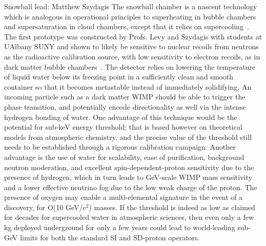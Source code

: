 Snowball lead: Matthew Szydagis
The snowball chamber is a nascent technology which is analogous in operational principles to superheating in bubble chambers and supersaturation in cloud chambers, except that it relies on supercooling~\cite{szydagis2021}. The first prototype was constructed by Profs. Levy and Szydagis with students at UAlbany SUNY and shown to likely be sensitive to nuclear recoils from neutrons as the radioactive calibration source, with low sensitivity to electron recoils, as in dark matter bubble chambers~\cite{PICO:2019vsc}. The detector relies on lowering the temperature of liquid water below its freezing point in a sufficiently clean and smooth container so that it becomes metastable instead of immediately solidifying. An incoming particle such as a dark matter WIMP should be able to trigger the phase transition, and potentially encode directionality as well via the intense hydrogen bonding of water. One advantage of this technique would be the potential for sub-keV energy threshold; that is based however on theoretical models from atmospheric chemistry, and the precise value of the threshold still needs to be established through a rigorous calibration campaign. Another advantage is the use of water for scalability, ease of purification, background neutron moderation, and excellent spin-dependent-proton sensitivity due to the presence of hydrogen, which in turn leads to GeV-scale WIMP mass sensitivity and a lower effective neutrino fog due to the low weak charge of the proton. The presence of oxygen may enable a multi-elemental signature in the event of a discovery, for O(10 GeV/c$^2$) masses. If the threshold is indeed as low as claimed for decades for supercooled water in atmospheric sciences, then even only a few kg deployed underground for only a few years could lead to world-leading sub-GeV limits for both the standard SI and SD-proton operators.

